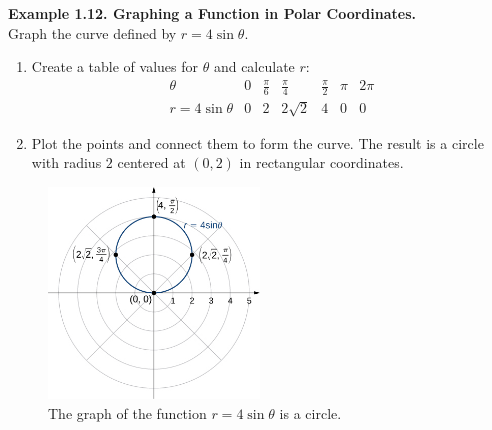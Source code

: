 \documentclass{article}
\begin{document}
\begin{examplebox}
\textbf{Example 1.12. Graphing a Function in Polar Coordinates.} \\
Graph the curve defined by $r = 4\sin\theta$.  
\begin{enumerate}
    \item Create a table of values for $\theta$ and calculate $r$:
    \[
    \begin{array}{c|c|c|c|c|c|c}
    \theta & 0 & \frac{\pi}{6} & \frac{\pi}{4} & \frac{\pi}{2} & \pi & 2\pi \\
    \hline
    r = 4\sin\theta & 0 & 2 & 2\sqrt{2} & 4 & 0 & 0
    \end{array}
    \]
    \item Plot the points and connect them to form the curve. The result is a circle with radius $2$ centered at $(0, 2)$ in rectangular coordinates.
\end{enumerate}
\begin{figure}[H]
    \centering
    \includegraphics[width=0.5\textwidth]{rEquals4sinTheta.jpg}
    \caption{The graph of the function \( r = 4\sin\theta \) is a circle.}
    \label{fig:sample_image}
\end{figure}
\end{examplebox}


\normalsize
\end{document}
